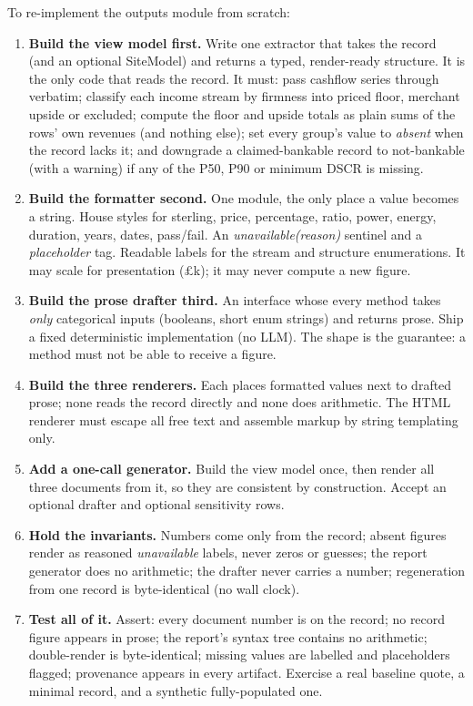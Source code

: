 \begin{rebuild}
To re-implement the outputs module from scratch:
\begin{enumerate}
  \item \textbf{Build the view model first.} Write one extractor that takes the record (and an optional SiteModel) and returns a typed, render-ready structure. It is the only code that reads the record. It must: pass cashflow series through verbatim; classify each income stream by firmness into priced floor, merchant upside or excluded; compute the floor and upside totals as plain sums of the rows' own revenues (and nothing else); set every group's value to \emph{absent} when the record lacks it; and downgrade a claimed-bankable record to not-bankable (with a warning) if any of the P50, P90 or minimum DSCR is missing.
  \item \textbf{Build the formatter second.} One module, the only place a value becomes a string. House styles for sterling, price, percentage, ratio, power, energy, duration, years, dates, pass/fail. An \emph{unavailable(reason)} sentinel and a \emph{placeholder} tag. Readable labels for the stream and structure enumerations. It may scale for presentation (\(\pounds\)k); it may never compute a new figure.
  \item \textbf{Build the prose drafter third.} An interface whose every method takes \emph{only} categorical inputs (booleans, short enum strings) and returns prose. Ship a fixed deterministic implementation (no LLM). The shape is the guarantee: a method must not be able to receive a figure.
  \item \textbf{Build the three renderers.} Each places formatted values next to drafted prose; none reads the record directly and none does arithmetic. The HTML renderer must escape all free text and assemble markup by string templating only.
  \item \textbf{Add a one-call generator.} Build the view model once, then render all three documents from it, so they are consistent by construction. Accept an optional drafter and optional sensitivity rows.
  \item \textbf{Hold the invariants.} Numbers come only from the record; absent figures render as reasoned \emph{unavailable} labels, never zeros or guesses; the report generator does no arithmetic; the drafter never carries a number; regeneration from one record is byte-identical (no wall clock).
  \item \textbf{Test all of it.} Assert: every document number is on the record; no record figure appears in prose; the report's syntax tree contains no arithmetic; double-render is byte-identical; missing values are labelled and placeholders flagged; provenance appears in every artifact. Exercise a real baseline quote, a minimal record, and a synthetic fully-populated one.
\end{enumerate}
\end{rebuild}
